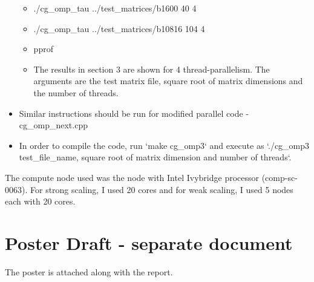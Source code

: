 \documentclass{article}
\begin{document}
\begin{spacing}{1.1}
\begin{appendices}
\begin{itemize}
\begin{itemize}
        \item ./cg\_omp\_tau ../test\_matrices/b1600 40 4
        \item ./cg\_omp\_tau ../test\_matrices/b10816 104 4
        \item pprof
        \item The results in section 3 are shown for 4 thread-parallelism.  The arguments are the test matrix file, square root of matrix dimensions and the number of threads.
    \end{itemize}
    \item Similar instructions should be run for modified parallel code - cg\_omp\_next.cpp
    \item In order to compile the code, run `make cg\_omp3` and execute as `./cg\_omp3 test\_file\_name, square root of matrix dimension and number of threads`.
    
\end{itemize}

The compute node used was the node with Intel Ivybridge processor (comp-sc-0063). For strong scaling, I used 20 cores and for weak scaling, I used 5 nodes each with 20 cores.


\section{Poster Draft - separate document}
The poster is attached along with the report.


\end{appendices}





\end{spacing}
\end{document}
